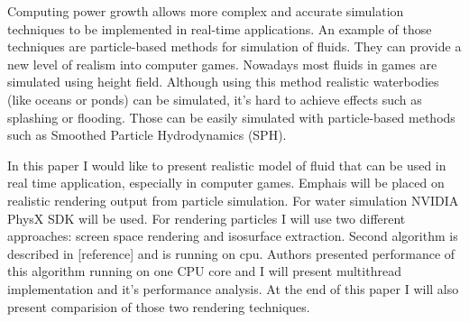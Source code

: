


\begin{abstracts}        %

Computing power growth allows more complex and accurate simulation techniques to be implemented in 
real-time applications. An example of those techniques are particle-based methods for simulation of fluids. 
They can provide a new level of realism into computer games. Nowadays most fluids in games are simulated using height field. 
Although using this method realistic waterbodies (like oceans or ponds) can be simulated, it's hard to achieve effects such as splashing or flooding.
Those can be easily simulated with particle-based methods such as Smoothed Particle Hydrodynamics (SPH). 

In this paper I would like to present realistic model of fluid that can be used in real time application, especially in computer games. Emphais will be placed on realistic rendering output from particle simulation.
For water simulation NVIDIA PhysX SDK will be used. For rendering particles I will use two different approaches: screen space rendering and isosurface extraction. Second algorithm is described in [reference] and is running on cpu. Authors presented performance of this algorithm running on one CPU core and I will present multithread implementation and it's performance analysis. At the end of this paper I will also present comparision of those two rendering techniques. 


\end{abstracts}


